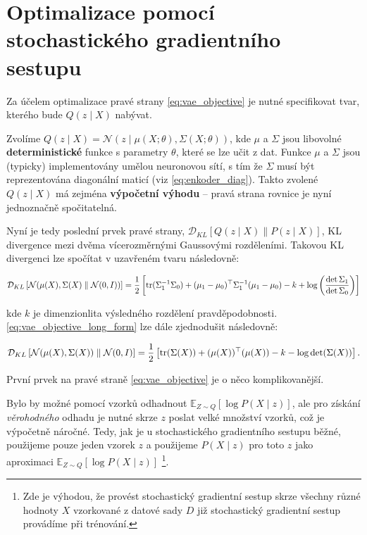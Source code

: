 \section{Optimalizace pomocí stochastického gradientního sestupu}
\label{sec:vae_optimization}

Za účelem optimalizace pravé strany \autoref{eq:vae_objective} je nutné specifikovat tvar, kterého bude $Q(z\mid X)$ nabývat.

Zvolíme $Q(z\mid X) = \mathcal{N}(z\mid \mu(X;\theta),\Sigma(X;\theta))$, kde $\mu$ a $\Sigma$ jsou libovolné \textbf{deterministické} funkce s parametry $\theta$, které se lze učit z dat.
Funkce $\mu$ a $\Sigma$ jsou (typicky) implementovány umělou neuronovou sítí, s tím že $\Sigma$ musí být reprezentována diagonální maticí (viz \autoref{eq:enkoder_diag}).
Takto zvolené $Q(z\mid X)$ má zejména \textbf{výpočetní výhodu} – pravá strana rovnice je nyní jednoznačně spočitatelná.

Nyní je tedy poslední prvek pravé strany, $\mathcal{D}_{KL}\left[ Q(z \mid X)\parallel P(z\mid X) \right]$, KL divergence mezi dvěma vícerozměrnými Gaussovými rozděleními.
Takovou KL divergenci lze spočítat v uzavřeném tvaru následovně:

\begin{equation}\label{eq:vae_objective_long_form}
    \mathcal{D}_{KL} \left[ \mathcal{N}(\mu(X), \Sigma(X)\parallel \mathcal{N}(0, I)) \right] = 
    \frac{1}{2}\left[ \operatorname{\text{tr}} (\Sigma_1^{-1}\Sigma_0) + (\mu_1 - \mu_0)^\top \Sigma_1^{-1}(\mu_1 - \mu_0) - k + \log \left(\frac{\det \Sigma_1}{\det \Sigma_0} \right) \right]
\end{equation}

kde $k$ je dimenzionlita výsledného rozdělení pravděpodobnosti. \autoref{eq:vae_objective_long_form} lze dále zjednodušit následovně:

\begin{equation}
    \mathcal{D}_{KL} \left[ \mathcal{N}(\mu(X), \Sigma(X)) \parallel \mathcal{N}(0, I) \right] = 
    \frac{1}{2} \left[ \operatorname{\text{tr}} (\Sigma(X)) + (\mu(X))^\top (\mu(X)) - k - \log \det (\Sigma(X)) \right].
\end{equation}

První prvek na pravé straně \autoref{eq:vae_objective} je o něco komplikovanější.

Bylo by možné pomocí vzorků odhadnout $\mathds{E}_{Z\sim Q}[\log P(X\mid z)]$, ale pro získání \emph{věrohodného} odhadu je nutné skrze $z$ poslat velké množství vzorků, což je výpočetně náročné.
Tedy, jak je u stochastického gradientního sestupu běžné, použijeme pouze jeden vzorek $z$ a použijeme $P(X\mid z)$ pro toto $z$ jako aproximaci $\mathds{E}_{Z\sim Q}[\log P(X\mid z)]$
\footnote{Zde je výhodou, že provést stochastický gradientní sestup skrze všechny různé hodnoty $X$ vzorkované z datové sady $D$ již stochastický gradientní sestup provádíme při trénování.}.

